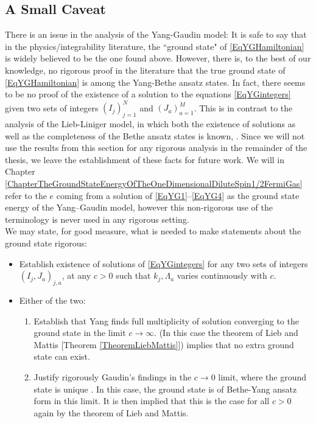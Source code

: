 \subsection{A Small Caveat}\label{SubsectionYGCaveat}
There is an issue in the analysis of the Yang-Gaudin model: It is safe to say that in the physics/integrability literature, the ``ground state" of \eqref{EqYGHamiltonian} is widely believed to be the one found above. However, there is, to the best of our knowledge, no rigorous proof in the literature that the true ground state of \eqref{EqYGHamiltonian} is among the Yang-Bethe ansatz states. In fact, there seems to be no proof of the existence of a solution to the equations \eqref{EqYGintegers} given two sets of integers $ (I_j)_{j=1}^{N} $ and $ (J_a)_{a=1}^{M} $. This is in contrast to the analysis of the Lieb-Liniger model, in which both the existence of solutions as well as the completeness of the Bethe ansatz states is known, \cite{cmp/1104252974}. Since we will not use the results from this section for any rigorous analysis in the remainder of the thesis, we leave the establishment of these facts for future work. We will in Chapter \ref{ChapterTheGroundStateEnergyOfTheOneDimensionalDiluteSpin1/2FermiGas} refer to the $ e $ coming from a solution of \eqref{EqYG1}--\eqref{EqYG4} as the ground state energy of the Yang--Gaudin model, however this non-rigorous use of the terminology is never used in any rigorous setting.\\
We may state, for good measure, what is needed to make statements about the ground state rigorous:
\begin{itemize}
	\item Establish existence of solutions of \eqref{EqYGintegers} for any two sets of integers $ (I_j,J_a)_{j,a} $, at any $ c>0 $ such that $ k_j,\Lambda_a $ varies continuously with $ c $.
	\item Either of the two: \begin{enumerate}
		\item Establish that Yang finds full multiplicity of solution converging to the ground state in the limit $ c\to\infty $. (In this case the theorem of Lieb and Mattis [Theorem \ref{TheoremLiebMattis}]) implies that no extra ground state can exist.
		\item Justify rigorously Gaudin's findings in the $ c\to 0 $ limit, where the ground state is unique \cite{gaudin1967systeme}. In this case, the ground state is of Bethe-Yang ansatz form in this limit. It is then implied that this is the case for all $ c>0 $ again by the theorem of Lieb and Mattis.
	\end{enumerate}
\end{itemize}










